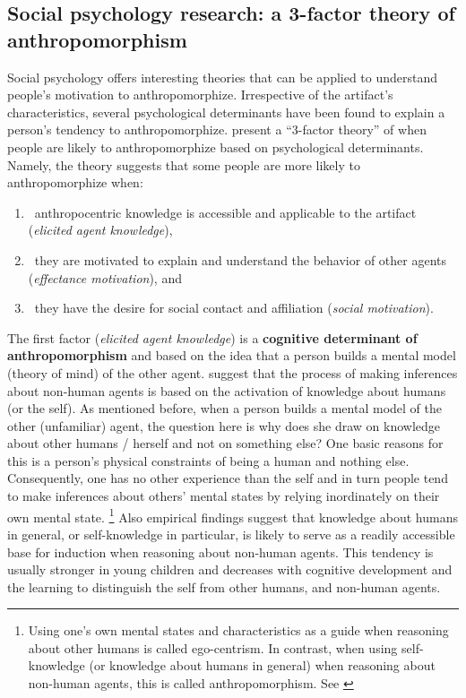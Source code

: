 \documentclass{frontiersSCNS} %
\begin{document}
\subsection{Social psychology research: a 3-factor theory of anthropomorphism}
\label{sec:psychological-factors}

Social psychology offers interesting theories that can be applied to understand people's motivation to anthropomorphize. Irrespective of the artifact's characteristics, several psychological determinants have been found to explain a person's tendency to anthropomorphize. \cite{epley_seeing_2007} present a ``3-factor theory'' of when people are likely to anthropomorphize based on psychological determinants. Namely, the theory suggests that some people are more likely to anthropomorphize when: 

\begin{enumerate}
	\item ~anthropocentric knowledge is accessible and applicable to the artifact (\textit{elicited agent knowledge}),
	\item ~they are motivated to explain and understand the behavior of other agents (\textit{effectance motivation}), and
	\item ~they have the desire for social contact and affiliation (\textit{social motivation}).
\end{enumerate}

The first factor (\textit{elicited agent knowledge}) is a \textbf{cognitive determinant of anthropomorphism} and based on the idea that a person builds a mental model (theory of mind) of the other agent. \cite{epley_seeing_2007} suggest that the process of making inferences about non-human agents is based on the activation of knowledge about humans (or the self). As mentioned before, when a person builds a mental model of the other (unfamiliar) agent, the question here is why does she draw on knowledge about other humans / herself and not on something else? One basic reasons for this is a person's physical constraints of being a human and nothing else. Consequently, one has no other experience than the self and in turn people tend to make inferences about others' mental states by relying inordinately on their own mental state. \footnote{Using one's own mental states and characteristics as a guide when reasoning about other humans is called ego-centrism. In contrast, when using self-knowledge (or knowledge about humans in general) when reasoning about non-human agents, this is called anthropomorphism. See \cite{epley_seeing_2007}} Also empirical findings suggest that knowledge about humans in general, or self-knowledge in particular, is likely to serve as a readily accessible base for induction when reasoning about non-human agents. This tendency is usually stronger in young children and decreases with cognitive development and the learning to distinguish the self from other humans, and non-human agents. 
	
\end{document}
